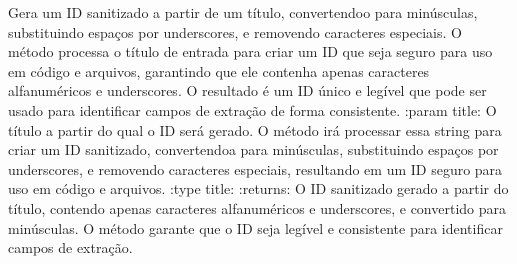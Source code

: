 \documentclass[letterpaper,10pt,english]{sphinxmanual}
\begin{document}
\begin{fulllineitems}

\begin{fulllineitems}
\label{\detokenize{api/models:models.Campo.fixo}}
\pysigstartsignatures
\pysigline
{}
\pysigstopsignatures
\end{fulllineitems}


\begin{fulllineitems}
\label{\detokenize{api/models:models.Campo.locked}}
\pysigstartsignatures
\pysigline
{}
\pysigstopsignatures
\end{fulllineitems}


\end{fulllineitems}


\begin{fulllineitems}
\label{\detokenize{api/models:models.sanitize_id}}
\pysigstartsignatures
\pysiglinewithargsret
{}
{}
{}
\pysigstopsignatures
\sphinxAtStartPar
Gera um ID sanitizado a partir de um título, convertendo\sphinxhyphen{}o para minúsculas, substituindo espaços por underscores, e removendo caracteres especiais. O método processa o título de entrada para criar um ID que seja seguro para uso em código e arquivos, garantindo que ele contenha apenas caracteres alfanuméricos e underscores. O resultado é um ID único e legível que pode ser usado para identificar campos de extração de forma consistente.
:param title: O título a partir do qual o ID será gerado. O método irá processar essa string para criar um ID sanitizado, convertendo\sphinxhyphen{}a para minúsculas, substituindo espaços por underscores, e removendo caracteres especiais, resultando em um ID seguro para uso em código e arquivos.
:type title: 
:returns: O ID sanitizado gerado a partir do título, contendo apenas caracteres alfanuméricos e underscores, e convertido para minúsculas. O método garante que o ID seja legível e consistente para identificar campos de extração.
\begin{quote}\begin{description}
\sphinxAtStartPar
{}

\end{description}\end{quote}

\end{fulllineitems}
\end{document}
